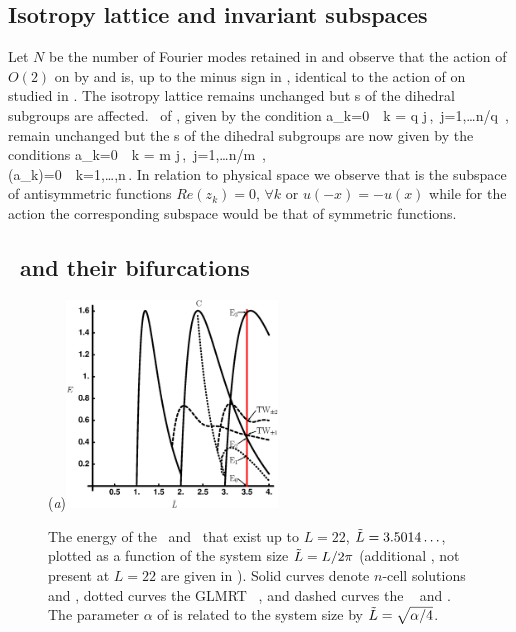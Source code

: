 \subsection{Isotropy lattice and invariant subspaces}
\label{sec:ksIso}

Let $N$ be the number of Fourier modes retained in 
and observe that the action of $O(2)$
on  by  and  is,
up to the minus sign in , identical
to the action  of  on  studied
in .
The isotropy lattice remains unchanged but \fixedsp s of the dihedral subgroups are affected.
\Fixedsp\ of , given by the condition
\beq
	a_k=0\ \ k = q j\,,\ j=1,\ldots\lfloor n/q \rfloor\,,
	\label{eq:O2ksCqFix}
\eeq
remain unchanged but the \fixedsp s of the dihedral subgroups  are now given by the conditions
\bea
	a_k=0\ \ k = m j\,,\ j=1,\ldots\lfloor n/m \rfloor\,, \\
	\Re(a_k)=0\ \ k=1,\ldots,n\,.
	\label{eq:O2ksDqFix}
\eea
In relation to physical space we observe that  is the subspace of antisymmetric functions $Re(z_k)=0,\, \forall k$ or $u(-x)=-u(x)$ while for the action  the corresponding
subspace would be that of symmetric functions.

\subsection{\Eqva\ and their bifurcations}
\label{sec:ksBif}

\begin{figure}[ht]
\begin{center}
  (\textit{a})\includegraphics[width=0.5\textwidth]{../figs/ksBifDiag}
\end{center}
\caption[KS steady state bifurcations]{
The energy  of the \eqva\ and \reqva\ that
exist up to $L=22$, $\tilde{L} = 3.5014\ldots$, plotted as a function
of the system size $\tilde{L} = L/2\pi$ (additional \eqva, not present
at $L = 22$ are given in ). Solid curves denote
$n$-cell solutions  and , dotted curves the GLMRT
\eqv\ ,
and dashed curves the \reqva\  and .
The parameter $\alpha$ of  is
related to the system size by $\tilde{L}=\sqrt{\alpha/4}$.    }
\label{fig:ksBifDiag}
\end{figure}

